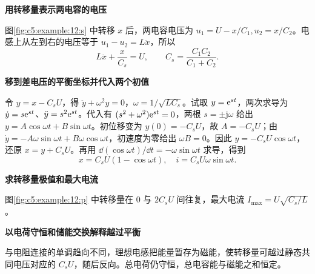 \begin{solution}\textbf{用转移量表示两电容的电压}\par\nobreak
图\ref{fig:c5:example:12:s} 中转移 $x$ 后，两电容电压为 $u_1=U-x/C_1,u_2=x/C_2$。电感上从左到右的电压等于 $u_1-u_2=L\ddot x$，所以
\[
 L\ddot x+\frac{x}{C_s}=U,\qquad C_s=\frac{C_1C_2}{C_1+C_2}.
\]


\par\medskip{}\noindent\textbf{移到差电压的平衡坐标并代入两个初值}\par\nobreak
令 $y=x-C_sU$，得 $\ddot y+\omega^2y=0$，$\omega=1/\sqrt{LC_s}$。试取 $y=\mathrm e^{st}$，两次求导为 $\dot y=s\mathrm e^{st}$、$\ddot y=s^2\mathrm e^{st}$。代入有 $(s^2+\omega^2)\mathrm e^{st}=0$，两根 $s=\pm\mathrm j\omega$ 给出 $y=A\cos\omega t+B\sin\omega t$。初位移变为 $y(0)=-C_sU$，故 $A=-C_sU$；由 $\dot y=-A\omega\sin\omega t+B\omega\cos\omega t$，初速度为零给出 $\omega B=0$。因此 $y=-C_sU\cos\omega t$，还原 $x=y+C_sU$。再用 $\dd(\cos\omega t)/\dd t=-\omega\sin\omega t$ 求导，得到
\[
 x=C_sU(1-\cos\omega t),\quad i=C_sU\omega\sin\omega t.
\]



\par\medskip{}\noindent\textbf{求转移量极值和最大电流}\par\nobreak
图\ref{fig:c5:example:12:p} 中转移量在 $0$ 与 $2C_sU$ 间往复，最大电流 $I_{\max}=U\sqrt{C_s/L}$。

\par\medskip{}\noindent\textbf{以电荷守恒和储能交换解释越过平衡}\par\nobreak
与电阻连接的单调趋向不同，理想电感把能量暂存为磁能，使转移量可越过静态共同电压对应的 $C_sU$，随后反向。总电荷仍守恒，总电容能与磁能之和恒定。\end{solution}
